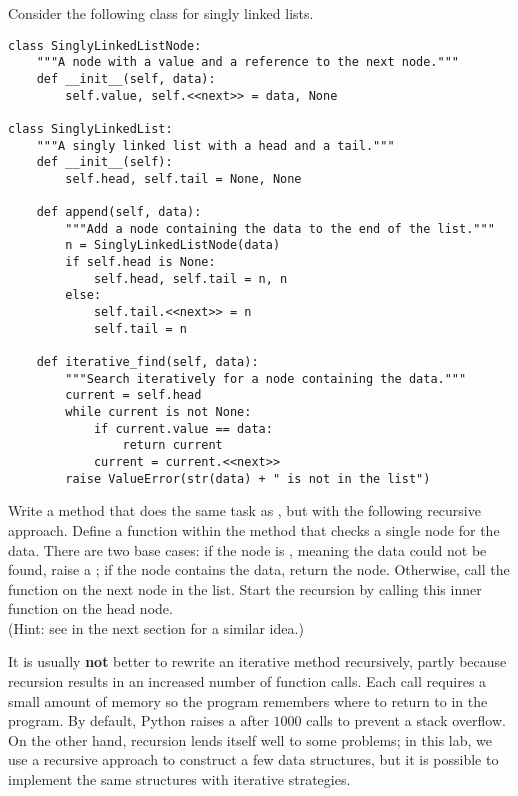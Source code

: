 \begin{problem}
\label{prob:recursive-linked-list-find}
Consider the following class for singly linked lists.
\begin{lstlisting}
class SinglyLinkedListNode:
    """A node with a value and a reference to the next node."""
    def __init__(self, data):
        self.value, self.<<next>> = data, None

class SinglyLinkedList:
    """A singly linked list with a head and a tail."""
    def __init__(self):
        self.head, self.tail = None, None

    def append(self, data):
        """Add a node containing the data to the end of the list."""
        n = SinglyLinkedListNode(data)
        if self.head is None:
            self.head, self.tail = n, n
        else:
            self.tail.<<next>> = n
            self.tail = n

    def iterative_find(self, data):
        """Search iteratively for a node containing the data."""
        current = self.head
        while current is not None:
            if current.value == data:
                return current
            current = current.<<next>>
        raise ValueError(str(data) + " is not in the list")
\end{lstlisting}
Write a method that does the same task as , but with the following recursive approach.
Define a function within the method that checks a single node for the data.
There are two base cases: if the node is , meaning the data could not be found, raise a ; if the node contains the data, return the node.
Otherwise, call the function on the next node in the list.
Start the recursion by calling this inner function on the head node.
\\(Hint: see  in the next section for a similar idea.)
\end{problem}

\begin{warn} %
It is usually \textbf{not} better to rewrite an iterative method recursively, partly because recursion results in an increased number of function calls.
Each call requires a small amount of memory so the program remembers where to return to in the program.
By default, Python raises a  after $1000$ calls to prevent a stack overflow.
On the other hand, recursion lends itself well to some problems; in this lab, we use a recursive approach to construct a few data structures, but it is possible to implement the same structures with iterative strategies.
\end{warn}

